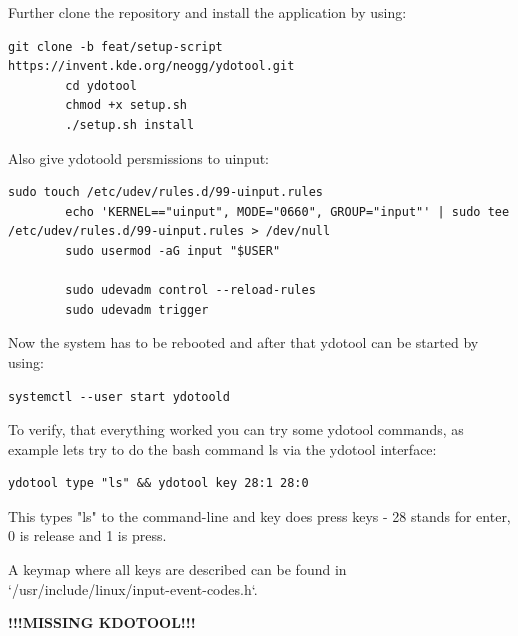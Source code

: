     Further clone the repository and install the application by using:
    \begin{lstlisting}[gobble=8]
        git clone -b feat/setup-script https://invent.kde.org/neogg/ydotool.git
        cd ydotool
        chmod +x setup.sh
        ./setup.sh install
    \end{lstlisting}

    Also give ydotoold persmissions to uinput:
    \begin{lstlisting}[gobble=8]
        sudo touch /etc/udev/rules.d/99-uinput.rules
        echo 'KERNEL=="uinput", MODE="0660", GROUP="input"' | sudo tee /etc/udev/rules.d/99-uinput.rules > /dev/null
        sudo usermod -aG input "$USER"

        sudo udevadm control --reload-rules
        sudo udevadm trigger
    \end{lstlisting}

    Now the system has to be rebooted and after that ydotool can be started by 
    using:
    \begin{lstlisting}[gobble=8]
        systemctl --user start ydotoold
    \end{lstlisting}

    To verify, that everything worked you can try some ydotool commands, 
    as example lets try to do the bash command ls via the  ydotool interface:
    \begin{lstlisting}[gobble=8]
        ydotool type "ls" && ydotool key 28:1 28:0
    \end{lstlisting}
    This types "ls" to the command-line and key does press keys - 
    28 stands for enter, 0 is release and 1 is press.

    A keymap where all keys are described can be found in `/usr/include/linux/input-event-codes.h`.

    \textbf{!!!MISSING KDOTOOL!!!}
    \newpage

